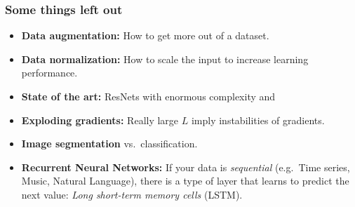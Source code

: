 \documentclass[10pt,hyperref={pdfpagelabels=false}]{beamer}
\begin{document}
\begin{frame}
    \frametitle{Some things left out}
    \begin{itemize}
        \item {\bf Data augmentation:} How to get more out of a dataset.
        \item {\bf Data normalization:} How to scale the input to increase learning performance.
        \item {\bf State of the art:} ResNets with enormous complexity and
        \item {\bf Exploding gradients:} Really large $L$ imply instabilities of gradients.
        \item {\bf Image segmentation} vs.~classification.
        \item {\bf Recurrent Neural Networks:} If your data is \emph{sequential} (e.g.~Time series, Music, Natural Language), there is a type of layer that learns to predict the next value: \emph{Long short-term memory cells} (LSTM).
    \end{itemize}
\end{frame}
\end{document}
